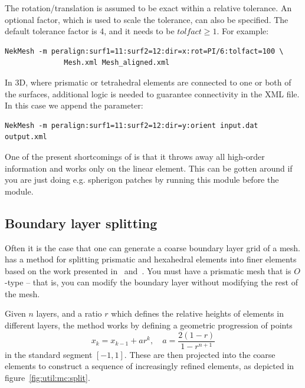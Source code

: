 The rotation/translation is assumed to be exact within a relative tolerance.
An optional factor, which is used to scale the tolerance, 
can also be specified. The default tolerance factor is 4, and it needs to be
$tolfact \ge 1$. For example:
%
\begin{lstlisting}[style=BashInputStyle]
NekMesh -m peralign:surf1=11:surf2=12:dir=x:rot=PI/6:tolfact=100 \
              Mesh.xml Mesh_aligned.xml
\end{lstlisting}
%

In 3D, where prismatic or tetrahedral elements are connected to one or both of
the surfaces, additional logic is needed to guarantee connectivity in the XML
file. In this case we append the \inltt{orient} parameter:
%
\begin{lstlisting}[style=BashInputStyle]
NekMesh -m peralign:surf1=11:surf2=12:dir=y:orient input.dat output.xml
\end{lstlisting}

\begin{notebox}
  One of the present shortcomings of  is that it throws away all
  high-order information and works only on the linear element. This can be
  gotten around if you are just doing e.g. spherigon patches by running this
  \inltt{peralign} module before the \inltt{spherigon} module.
\end{notebox}

\subsection{Boundary layer splitting}

Often it is the case that one can generate a coarse boundary layer grid of a
mesh. \nm has a method for splitting prismatic and hexahedral elements into
finer elements based on the work presented in~\cite{MoHaPeSh14}
and~\cite{MoHaPeSh14b}. You must have a prismatic mesh that is $O$-type -- that
is, you can modify the boundary layer without modifying the rest of the mesh.

Given $n$ layers, and a ratio $r$ which defines the relative heights of elements
in different layers, the method works by defining a geometric progression of
points
\[
x_k = x_{k-1} + ar^k, \quad a = \frac{2(1-r)}{1 - r^{n+1}}
\]
in the standard segment $[-1,1]$. These are then projected into the coarse
elements to construct a sequence of increasingly refined elements, as depicted
in figure~\ref{fig:util:mc:split}.

